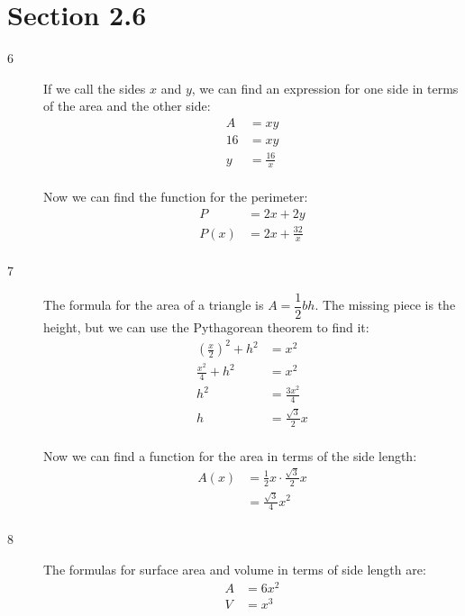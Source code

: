 \documentclass{exam}
\begin{document}
  \section{Section 2.6}
  \begin{description}
    \item[6] 
      If we call the sides $x$ and $y$, we can find an expression for one side in terms of the area and the other
      side:
      \begin{align*}
        A &= xy \\
        16 &= xy \\
        y &= \frac{16}{x} \\
      \end{align*}

      Now we can find the function for the perimeter:
      \begin{align*}
        P    &= 2x + 2y \\
        P(x) &= 2x + \frac{32}{x} \\
      \end{align*}

    \item[7]
      The formula for the area of a triangle is $A = \dfrac{1}{2} bh$.  The missing piece is the height, but we can use
      the Pythagorean theorem to find it:
      \begin{align*}
        \left( \frac{x}{2} \right)^2 + h^2 &= x^2 \\
        \frac{x^2}{4} + h^2                &= x^2 \\
        h^2                                &= \frac{3x^2}{4} \\
        h                                  &= \frac{\sqrt{3}}{2} x \\
      \end{align*}

      Now we can find a function for the area in terms of the side length:
      \begin{align*}
        A(x) &= \frac{1}{2} x \cdot \frac{\sqrt{3}}{2} x  \\
             &= \frac{\sqrt{3}}{4} x^2 \\
      \end{align*}

    \item[8]
      The formulas for surface area and volume in terms of side length are:
      \begin{align*}
        A &= 6x^2 \\
        V &= x^3 \\
      \end{align*}


\end{description}
\end{document}
